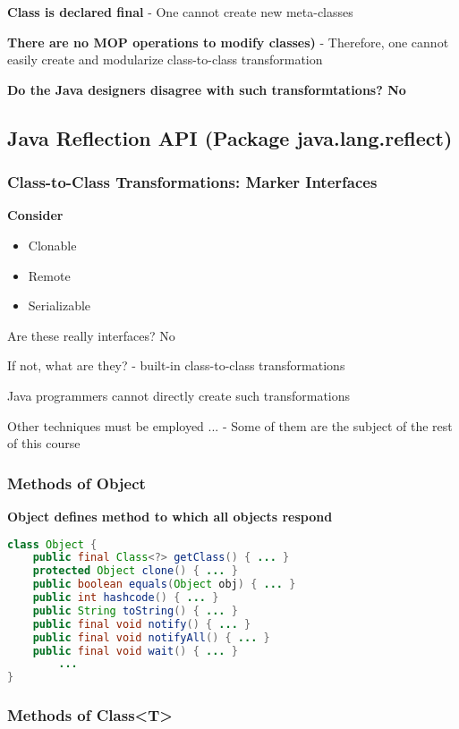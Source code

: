 \textbf{Class is declared final}
	- One cannot create new meta-classes

\textbf{There are no MOP operations to modify classes)}
	- Therefore, one cannot easily create and modularize class-to-class transformation

\textbf{Do the Java designers disagree with such transformtations? No}

\subsection{Java Reflection API (Package java.lang.reflect)}

\subsubsection{Class-to-Class Transformations: Marker Interfaces}

\textbf{Consider}
\begin{itemize}
	\item Clonable
	\item Remote
	\item Serializable
\end{itemize}

Are these really interfaces? No

If not, what are they?
	- built-in class-to-class transformations

Java programmers cannot directly create such transformations

Other techniques must be employed ...
	- Some of them are the subject of the rest of this course

\subsubsection{Methods of Object}

\textbf{Object defines method to which all objects respond}

\begin{lstlisting}[language=Java]
class Object {
	public final Class<?> getClass() { ... }
	protected Object clone() { ... }
	public boolean equals(Object obj) { ... }
	public int hashcode() { ... }
	public String toString() { ... }
	public final void notify() { ... }
	public final void notifyAll() { ... }
	public final void wait() { ... }
		...
}
\end{lstlisting}

\subsubsection{Methods of Class<T>}

